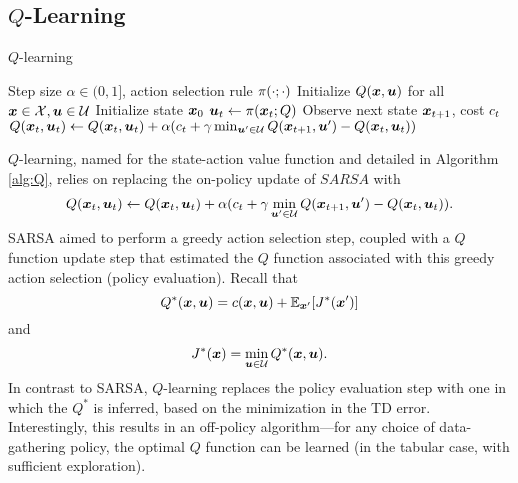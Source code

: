 \subsection{$Q$-Learning}

\begin{algorithm}[t]
\caption{$Q$-learning}
\centering
\label{alg:Q}

\begin{algorithmic}[1]
    \Require Step size $\alpha \in (0,1]$, action selection rule $\pi(\cdot; \cdot)$
    \State Initialize $Q(\bm{x},\bm{u})$ for all $\bm{x} \in \mathcal{X}, \bm{u} \in \mathcal{U}$
        \State Initialize state $\bm{x}_0$
            \State $\bm{u}_t \gets \pi(\bm{x}_t; Q)$
            \State Observe next state $\bm{x}_{t+1}$, cost $c_{t}$
            \State $Q(\bm{x}_t,\bm{u}_t) \gets Q(\bm{x}_t,\bm{u}_t) + \alpha (c_t + \gamma \min_{\bm{u}' \in \mathcal{U}} Q(\bm{x}_{t+1},\bm{u}') - Q(\bm{x}_t,\bm{u}_t))$
        \EndFor
    \EndFor
\end{algorithmic}
\end{algorithm}

$Q$-learning, named for the state-action value function and detailed in Algorithm \ref{alg:Q}, relies on replacing the on-policy update of $SARSA$ with 
\begin{equation}
    Q(\bm{x}_t,\bm{u}_t) \gets Q(\bm{x}_t,\bm{u}_t) + \alpha (c_t + \gamma \min_{\bm{u}' \in \mathcal{U}} Q(\bm{x}_{t+1},\bm{u}') - Q(\bm{x}_t,\bm{u}_t)).
\end{equation}
SARSA aimed to perform a greedy action selection step, coupled with a $Q$ function update step that estimated the $Q$ function associated with this greedy action selection (policy evaluation). Recall that
\begin{equation}
    Q^*(\bm{x},\bm{u}) = c(\bm{x},\bm{u}) + \mathbb{E}_{\bm{x}'}[J^*(\bm{x}')]
\end{equation}
and
\begin{equation}
    J^*(\bm{x}) = \min_{\bm{u} \in \mathcal{U}} Q^*(\bm{x},\bm{u}).
\end{equation}
In contrast to SARSA, $Q$-learning replaces the policy evaluation step with one in which the $Q^*$ is inferred, based on the minimization in the TD error. Interestingly, this results in an off-policy algorithm---for any choice of data-gathering policy, the optimal $Q$ function can be learned (in the tabular case, with sufficient exploration). 

